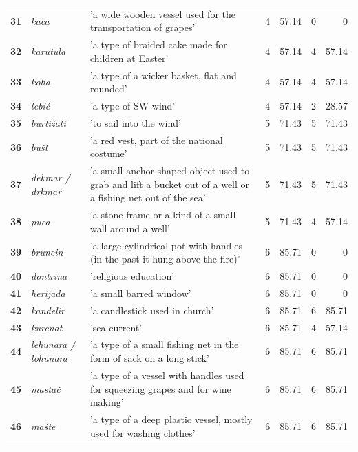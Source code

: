 \documentclass[output=paper]{LSP/langsci}
\begin{document}
\begin{table}
{\begin{tabular}{lp{}p{}lrlr}
{\bfseries 31} & {\itshape kaca} & 'a wide wooden vessel used for the transportation of grapes' & 4 & 57.14 & 0 & 0\\

{\bfseries 32} & {\itshape karutula} & 'a type of braided cake made for children at Easter' & 4 & 57.14 & 4 & 57.14\\

{\bfseries 33} & {\itshape koha} & 'a type of a wicker basket, flat and rounded' & 4 & 57.14 & 4 & 57.14\\

{\bfseries 34} & {\itshape lebić} & 'a type of SW wind' & 4 & 57.14 & 2 & 28.57\\

{\bfseries 35} & {\itshape burtižati} & 'to sail into the wind' & 5 & 71.43 & 5 & 71.43\\

{\bfseries 36} & {\itshape bušt} & 'a red vest, part of the national costume' & 5 & 71.43 & 5 & 71.43\\

{\bfseries 37} & {\itshape dekmar / drkmar} & 'a small anchor-shaped object used to grab and lift a bucket out of a well or a fishing net out of the sea' & 5 & 71.43 & 5 & 71.43\\

{\bfseries 38} & {\itshape puca} & 'a stone frame or a kind of a small wall around a well' & 5 & 71.43 & 4 & 57.14\\

{\bfseries 39} & {\itshape bruncin} & 'a large cylindrical pot with handles (in the past it hung above the fire)' & 6 & 85.71 & 0 & 0\\

{\bfseries 40} & {\itshape dontrina} & 'religious education' & 6 & 85.71 & 0 & 0\\

{\bfseries 41} & {\itshape herijada} & 'a small barred window' & 6 & 85.71 & 0 & 0\\

{\bfseries 42} & {\itshape kandelir} & 'a candlestick used in church' & 6 & 85.71 & 6 & 85.71\\

{\bfseries 43} & {\itshape kurenat} & 'sea current' & 6 & 85.71 & 4 & 57.14\\

{\bfseries 44} & {\itshape lehunara / lohunara} & 'a type of a small fishing net in the form of sack on a long stick' & 6 & 85.71 & 6 & 85.71\\

{\bfseries 45} & {\itshape mastač} & 'a type of a vessel with handles used for squeezing grapes and for wine making' & 6 & 85.71 & 6 & 85.71\\

{\bfseries 46} & {\itshape mašte} & 'a type of a deep plastic vessel, mostly used for washing clothes' & 6 & 85.71 & 6 & 85.71\\

\lspbottomrule
\end{tabular}
}
\end{table}
\end{document}
